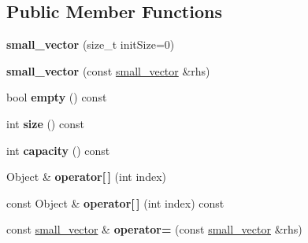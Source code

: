 \subsection*{Public Member Functions}
\begin{DoxyCompactItemize}
\item 
\hypertarget{classutil_1_1small__vector_a630b16ac8d92fdf6d805c78be355cbdf}{{\bfseries small\+\_\+vector} (size\+\_\+t init\+Size=0)}\label{classutil_1_1small__vector_a630b16ac8d92fdf6d805c78be355cbdf}

\item 
\hypertarget{classutil_1_1small__vector_a45e80cd3d7f4f70f650b9d8a0ae09404}{{\bfseries small\+\_\+vector} (const \hyperlink{classutil_1_1small__vector}{small\+\_\+vector} \&rhs)}\label{classutil_1_1small__vector_a45e80cd3d7f4f70f650b9d8a0ae09404}

\item 
\hypertarget{classutil_1_1small__vector_a00683377793be8b83e2d96a2c724d139}{bool {\bfseries empty} () const }\label{classutil_1_1small__vector_a00683377793be8b83e2d96a2c724d139}

\item 
\hypertarget{classutil_1_1small__vector_a1a8d54ae0d07dec6061c8505a37afa57}{int {\bfseries size} () const }\label{classutil_1_1small__vector_a1a8d54ae0d07dec6061c8505a37afa57}

\item 
\hypertarget{classutil_1_1small__vector_afb45c883f7c974679e96c586a98569dd}{int {\bfseries capacity} () const }\label{classutil_1_1small__vector_afb45c883f7c974679e96c586a98569dd}

\item 
\hypertarget{classutil_1_1small__vector_aadd9a3376737b2e5bf513f15ec3bc0b8}{Object \& {\bfseries operator\mbox{[}$\,$\mbox{]}} (int index)}\label{classutil_1_1small__vector_aadd9a3376737b2e5bf513f15ec3bc0b8}

\item 
\hypertarget{classutil_1_1small__vector_af545965f9d216e97dde1dcab9a14ee8b}{const Object \& {\bfseries operator\mbox{[}$\,$\mbox{]}} (int index) const }\label{classutil_1_1small__vector_af545965f9d216e97dde1dcab9a14ee8b}

\item 
\hypertarget{classutil_1_1small__vector_a53e0650a0d1490a6d3fbff93fedeabf7}{const \hyperlink{classutil_1_1small__vector}{small\+\_\+vector} \& {\bfseries operator=} (const \hyperlink{classutil_1_1small__vector}{small\+\_\+vector} \&rhs)}\label{classutil_1_1small__vector_a53e0650a0d1490a6d3fbff93fedeabf7}


\end{DoxyCompactItemize}
